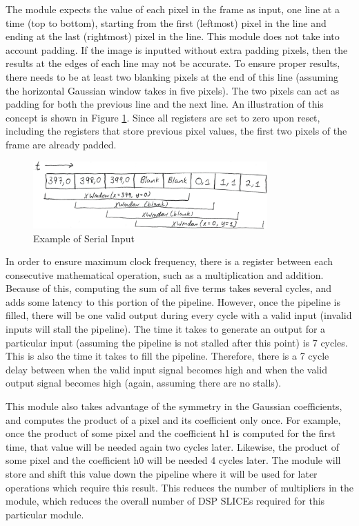 The module expects the value of each pixel in the frame as input, one line at 
a time (top to bottom), starting from the first (leftmost) pixel in the line and 
ending at the last (rightmost) pixel in the line. This module does not take into 
account padding. If the image is inputted without extra padding pixels, then the 
results at the edges of each line may not be accurate. To ensure proper results, 
there needs to be at least two blanking pixels at the end of this line (assuming 
the horizontal Gaussian window takes in five pixels). The two pixels can act as 
padding for both the previous line and the next line. An illustration of this 
concept is shown in Figure \ref{fig:serial}. Since all registers are set to 
zero upon reset, including the registers that store previous pixel values, the 
first two pixels of the frame are already padded.

\begin{figure}
    \centering
    \includegraphics[width=0.8\textwidth]{processed_image_pngs/serial_input.png}
    \caption{Example of Serial Input}
    \label{fig:serial}
\end{figure}

In order to ensure maximum clock frequency, there is a register between each 
consecutive mathematical operation, such as a multiplication and addition. 
Because of this, computing the sum of all five terms takes several cycles, and 
adds some latency to this portion of the pipeline. However, once the pipeline is 
filled, there will be one valid output during every cycle with a valid input 
(invalid inputs will stall the pipeline). The time it takes to generate an 
output for a particular input (assuming the pipeline is not stalled after this 
point) is 7 cycles. This is also the time it takes to fill the pipeline. 
Therefore, there is a 7 cycle delay between when the valid input signal becomes 
high and when the valid output signal becomes high (again, assuming there are no 
stalls).

This module also takes advantage of the symmetry in the Gaussian coefficients, 
and computes the product of a pixel and its coefficient only once. For example, 
once the product of some pixel and the coefficient h1 is computed for the first 
time, that value will be needed again two cycles later. Likewise, the product of 
some pixel and the coefficient h0 will be needed 4 cycles later. The module will 
store and shift this value down the pipeline where it will be used for later 
operations which require this result. This reduces the number of multipliers in 
the module, which reduces the overall number of DSP SLICEs required for this 
particular module.

